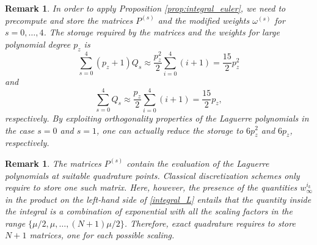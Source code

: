 \documentclass{article}
\newtheorem{remark}[theorem]{Remark}
\begin{document}
	\begin{remark}
		In order to apply Proposition \ref{prop:integral_euler}, we need to precompute and store the matrices $P^{(s)}$ and the modified weights $\omega^{(s)}$ for $s=0,\dots,4$. The storage required by the matrices and the weights for large polynomial degree $p_z$ is
		\begin{equation*}
			\sum_{s=0}^4(p_z+1)Q_s \approx \frac{p_z^2}{2}\sum_{i=0}^4(i+1) = \frac{15}{2}p_z^2
		\end{equation*}
		and
		\begin{equation*}
			\sum_{s=0}^4Q_s \approx \frac{p_z}{2}\sum_{i=0}^4(i+1) = \frac{15}{2}p_z,
		\end{equation*}
		respectively. By exploiting orthogonality properties of the Laguerre polynomials in the case $s=0$ and $s=1$, one can actually reduce the storage to $6p_z^2$ and $6p_z$, respectively.
	\end{remark}
	\begin{remark}
		The matrices $P^{(s)}$ contain the evaluation of the Laguerre polynomials at suitable quadrature points. Classical discretization schemes only require to store one such matrix. Here, however, the presence of the quantities $w^{i_k}_\infty$ in the product on the left-hand side of \eqref{integral_L} entails that the quantity inside the integral is a combination of exponential with all the scaling factors in the range $\{\mu/2,\mu,\dots,(N+1)\mu/2\}$. Therefore, exact quadrature requires to store $N+1$ matrices, one for each possible scaling.
	\end{remark}
	
\end{document}

